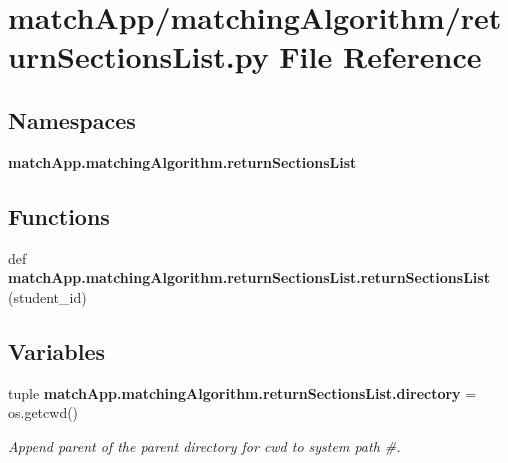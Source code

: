 \section{match\+App/matching\+Algorithm/return\+Sections\+List.py File Reference}
\label{return_sections_list_8py}
\subsection*{Namespaces}
\begin{DoxyCompactItemize}
\item 
 {\bf match\+App.\+matching\+Algorithm.\+return\+Sections\+List}
\end{DoxyCompactItemize}
\subsection*{Functions}
\begin{DoxyCompactItemize}
\item 
def {\bf match\+App.\+matching\+Algorithm.\+return\+Sections\+List.\+return\+Sections\+List} (student\+\_\+id)
\end{DoxyCompactItemize}
\subsection*{Variables}
\begin{DoxyCompactItemize}
\item 
tuple {\bf match\+App.\+matching\+Algorithm.\+return\+Sections\+List.\+directory} = os.\+getcwd()
\begin{DoxyCompactList}\small\item\em Append parent of the parent directory for cwd to system path \#. \end{DoxyCompactList}\end{DoxyCompactItemize}
